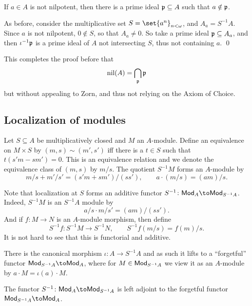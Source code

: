 \eproof

\bcoro

    If $a\in A$ is not nilpotent, then there is a prime ideal ${{\frak p}}\subseteq A$ such that $a\notin{{\frak p}}$.

\ecoro

\bproof

    As before, consider the multiplicative set $S=\set{a^n}_{n<\omega}$, and $A_a=S^{-1}A$.
    Since $a$ is not nilpotent, $0\notin S$, so that $A_a\neq0$.
    So take a prime ideal ${{\frak p}}\subseteq A_a$, and then $\iota^{-1}{{\frak p}}$ is a prime ideal of $A$ not intersecting $S$, thus not containing $a$.
    \qed

\eproof

\bnote

    This completes the proof before that
    $$ {\rm nil}(A) = \bigcap_{{\frak p}}{{\frak p}} $$
    but without appealing to Zorn, and thus not relying on the Axiom of Choice.

\enote

\subsection{Localization of modules}

\bdefn

    Let $S\subseteq A$ be multiplicatively closed and $M$ an $A$-module.
    Define an equivalence on $M\times S$ by $(m,s)\sim(m',s')$ iff there is a $t\in S$ such that $t(s'm-sm')=0$.
    This is an equivalence relation and we denote the equivalence class of $(m,s)$ by $m/s$.
    The quotient $S^{-1}M$ forms an $A$-module by
    $$ m/s + m'/s' = (s'm+sm')/(ss'),\qquad a\cdot(m/s) = (am)/s . $$

\edefn

Note that localization at $S$ forms an additive functor $S^{-1}\colon\Mod_A\to\Mod_{S^{-1}A}$.
Indeed, $S^{-1}M$ is an $S^{-1}A$ module by
$$ a/s\cdot m/s' = (am)/(ss') . $$
And if $f\colon M\to N$ is an $A$-module morphism, then define
$$ S^{-1}f\colon S^{-1}M\to S^{-1}N,\qquad S^{-1}f(m/s) = f(m)/s . $$
It is not hard to see that this is functorial and additive.

There is the canonical morphism $\iota\colon A\to S^{-1}A$ and as such it lifts to a ``forgetful'' functor $\Mod_{S^{-1}A}\to\Mod_A$,
where for $M\in{\sf Mod}_{S^{-1}A}$ we view it as an $A$-module by $a\cdot M=\iota(a)\cdot M$.

\bprop

    The functor $S^{-1}\colon\Mod_A\to\Mod_{S^{-1}A}$ is left adjoint to the forgetful functor $\Mod_{S^{-1}A}\to\Mod_A$.

